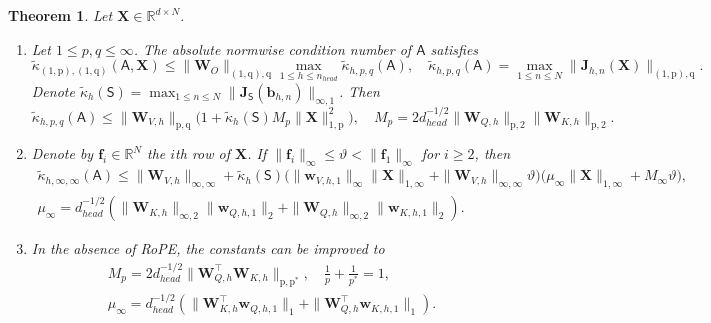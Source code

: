\documentclass[namedate,webpdf,imanum]{ima-authoring-template}
\newcommand{\Real}{\mathbb{R}}
\newcommand{\Matrix}[1]{\mathbf{#1}}
\newcommand{\trans}{\intercal}
\newcommand{\Norm}[3][]{#1\| #2 #1\|_{\mathrm{#3}}}
\newcommand{\Layer}[1]{\mathsf{#1}}
\newcommand{\condabs}[3][]{\tilde{\kappa}_{\mathrm{#2}} #1( #3 #1)}
\newtheorem{theorem}{Theorem}[section]%
\numberwithin{equation}{section}
\begin{document}
\begin{theorem}
\label{theorem:condabs-attention}
Let $\Matrix{X} \in \Real^{d \times N}$.
\begin{enumerate}
    \item Let $1 \leq p,q \leq \infty$.
    The absolute normwise condition number of $\Layer{A}$ satisfies
    \begin{equation*}
        \condabs{(1,p),(1,q)}{\Layer{A}, \Matrix{X}} \leq \Norm{\Matrix{W}_O}{(1,q),q} \max_{1 \leq h \leq n_{head}} \tilde{\kappa}_{h,p,q}(\Layer{A}), \quad \tilde{\kappa}_{h,p,q}(\Layer{A}) = \max_{1 \leq n \leq N} \Norm{\Matrix{J}_{h,n}(\Matrix{X})}{(1,p),q}.
    \end{equation*}
    Denote $\tilde{\kappa}_{h}(\Layer{S}) = \max_{1 \leq n \leq N} \Norm{\Matrix{J}_{\Layer{S}}(\Matrix{b}_{h,n})}{\infty,1}$.
    Then
    \begin{equation*}
        \tilde{\kappa}_{h,p,q}(\Layer{A}) \leq \Norm{\Matrix{W}_{V,h}}{p,q} \Big( 1 + \tilde{\kappa}_{h}(\Layer{S}) M_{p} \Norm{\Matrix{X}}{1,p}^2 \Big), \quad M_{p} = 2 d_{head}^{-1/2} \Norm{\Matrix{W}_{Q,h}}{p,2} \Norm{\Matrix{W}_{K,h}}{p,2}.
    \end{equation*}
    \item Denote by $\Matrix{f}_i \in \Real^N$ the $i$th row of $\Matrix{X}$.
    If $\Norm{\Matrix{f}_{i}}{\infty} \leq \vartheta < \Norm{\Matrix{f}_1}{\infty}$ for $i \geq 2$, then
    \begin{gather*}
        \tilde{\kappa}_{h,\infty,\infty}(\Layer{A}) \leq \Norm{\Matrix{W}_{V,h}}{\infty,\infty} + \tilde{\kappa}_{h}(\Layer{S}) \Big( \Norm{\Matrix{w}_{V,h,1}}{\infty} \Norm{\Matrix{X}}{1,\infty} + \Norm{\Matrix{W}_{V,h}}{\infty,\infty} \vartheta \Big) \Big( \mu_\infty \Norm{\Matrix{X}}{1,\infty} + M_\infty \vartheta \Big), \\
        \mu_\infty = d_{head}^{-1/2} (\Norm{\Matrix{W}_{K,h}}{\infty,2} \Norm{\Matrix{w}_{Q,h,1}}{2} + \Norm{\Matrix{W}_{Q,h}}{\infty,2} \Norm{\Matrix{w}_{K,h,1}}{2}).
    \end{gather*}
    \item In the absence of RoPE, the constants can be improved to
    \begin{gather*}
        M_{p} = 2 d_{head}^{-1/2} \Norm{\Matrix{W}_{Q,h}^\trans \Matrix{W}_{K,h}}{p,p^*}, \quad \tfrac{1}{p} + \tfrac{1}{p^*} = 1, \\
        \mu_\infty = d_{head}^{-1/2} (\Norm{\Matrix{W}_{K,h}^\trans \Matrix{w}_{Q,h,1}}{1} + \Norm{\Matrix{W}_{Q,h}^\trans \Matrix{w}_{K,h,1}}{1}).
    \end{gather*}
\end{enumerate}
\end{theorem}
\end{document}
